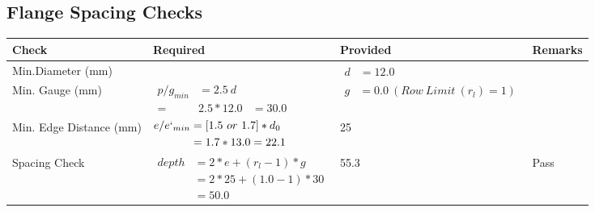 \documentclass{article}%
\begin{document}
\subsection{Flange Spacing Checks}%
\label{subsec:FlangeSpacingChecks}%
\renewcommand{\arraystretch}{1.2}%
\begin{longtable}{|p{2.5cm}|p{7.5cm}|p{5cm}|p{1cm}|}%
\hline%
\rowcolor{OsdagGreen}%
Check&Required&Provided&Remarks\\%
\hline%
\endhead%
\hline%
Min.Diameter (mm)&&$\begin{aligned} d &=12.0\end{aligned}$&\\%
\hline%
Min. Gauge (mm)&$\begin{aligned}p/g_{min}&= 2.5 ~ d&\\ =&2.5*12.0&=30.0\end{aligned}$&$\begin{aligned} g &=0.0~(Row~Limit~(r_l) = 1)\end{aligned}$&\\%
\hline%
Min. Edge Distance (mm)&$\begin{aligned}e/e`_{min} &=[1.5~or~ 1.7] * d_0\\ &=1.7*13.0=22.1 \end{aligned}$&25&\\%
\hline%
Spacing Check&$\begin{aligned} depth & = 2 * e + (r_l -1) * g\\ & = 2 * 25+(1.0-1)*30\\ & = 50.0\end{aligned}$&55.3&Pass\\%
\hline%
\end{longtable}

%
\newpage%
\end{document}
